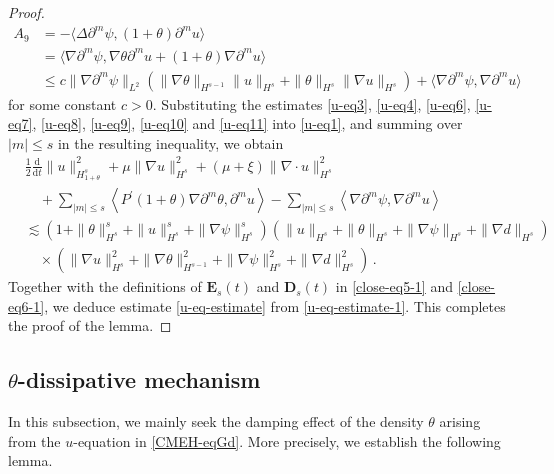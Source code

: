 \documentclass[reqno,11pt]{amsart}
\numberwithin{equation}{section}
\def\p{\partial}
\def\d{\mathrm{d}}
\begin{document}
\begin{proof}
\begin{equation}
\begin{aligned}
A_9&=- \langle\Delta \partial^m \psi, (1+\theta)\partial^m u \rangle\\& = \langle \nabla\partial^m \psi,  \nabla\theta\p^m u+ (1+\theta)\nabla\partial^m u \rangle\\&
\leq c\|\nabla \partial^m \psi\|_{L^2} \left( \|\nabla \theta\|_{H^{s-1}}\|u\|_{H^s} + \|\theta\|_{H^s}\|\nabla u\|_{H^s} \right)
+ \langle \nabla \partial^m \psi, \nabla \partial^m u \rangle
\end{aligned}
\end{equation}
for some constant $c > 0$. Substituting the estimates \eqref{u-eq3}, \eqref{u-eq4}, \eqref{u-eq6}, \eqref{u-eq7}, \eqref{u-eq8}, \eqref{u-eq9}, \eqref{u-eq10} and \eqref{u-eq11} into \eqref{u-eq1}, and summing over $|m|\le s$ in the resulting inequality, we obtain
\begin{equation}\label{u-eq-estimate-1}
\begin{aligned}
&\frac{1}{2} \frac{\d}{\d t} \|u\|_{H_{1+\theta}^s}^2 + \mu \|\nabla u\|_{H^s}^2 + (\mu + \xi) \|\nabla \cdot u\|_{H^s}^2\\&\quad
+ \sum_{|m| \leq s} \left\langle P^\prime(1+\theta) \nabla \partial^m \theta, \partial^m u \right\rangle - \sum_{|m| \leq s} \left\langle \nabla \partial^m \psi, \nabla \partial^m u \right\rangle \\&
\lesssim \left( 1 + \|\theta\|^s_{H^s} + \|u\|^s_{H^s} + \|\nabla\psi\|^s_{H^s} \right) \left( \| u\|_{H^s} + \| \theta\|_{H^s} + \|\nabla\psi\|_{H^s} + \|\nabla d\|_{H^s} \right) \\&
\quad\times \left( \|\nabla u\|_{H^s}^2 + \|\nabla \theta\|_{H^{s-1}}^2 + \|\nabla\psi\|_{H^s}^2 + \|\nabla d\|_{H^s}^2 \right)
 \,.
\end{aligned}
\end{equation}
Together with the definitions of $\mathbf{E}_s(t)$ and $\mathbf{D}_s(t)$ in \eqref{close-eq5-1} and \eqref{close-eq6-1}, we deduce estimate \eqref{u-eq-estimate} from \eqref{u-eq-estimate-1}. This completes the proof of the lemma.
\end{proof}

\subsection{$\theta$-dissipative mechanism}

In this subsection, we mainly seek the damping effect of the density $\theta$ arising from the $u$-equation in \eqref{CMEH-eqGd}. More precisely, we establish the following lemma.
\end{document}
